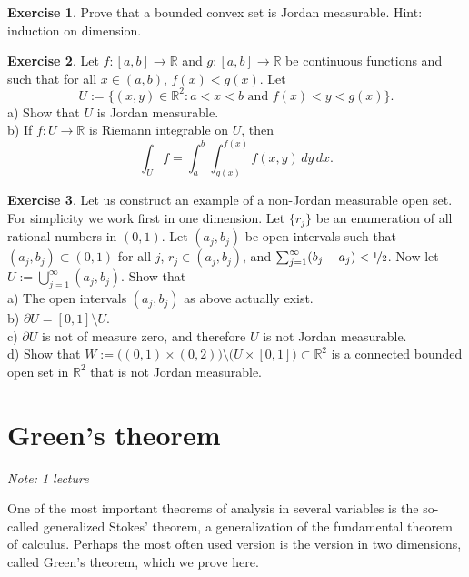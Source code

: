 \documentclass[12pt]{book}
\newcommand{\R}{{\mathbb{R}}}
\newcommand{\sectionnotes}[1]{\noindent \emph{Note: #1} \medskip \par}
\newcommand{\sectionnewpage}{\clearpage}
\theoremstyle{plain}
\theoremstyle{remark}
\theoremstyle{definition}
\theoremstyle{exercise}
\newtheorem{exercise}{Exercise}[section]
\theoremstyle{example}
\begin{document}
\begin{exercise}
Prove that a bounded convex set is Jordan measurable.  Hint: induction on
dimension.
\end{exercise}

\begin{exercise} \label{exercise:intovertypeIset}
Let $f \colon [a,b] \to \R$ and
$g \colon [a,b] \to \R$ be continuous functions and such that
for all $x \in (a,b)$, $f(x) < g(x)$.  Let
\begin{equation*}
U := \{ (x,y) \in \R^2 : a < x < b \text{ and } f(x) < y < g(x) \} .
\end{equation*}
a) Show that $U$ is Jordan measurable.\\
b) If $f \colon U \to \R$ is Riemann integrable on $U$, then
\begin{equation*}
\int_U f =
\int_a^b \int_{g(x)}^{f(x)} f(x,y) \, dy \, dx .
\end{equation*}
\end{exercise}

\begin{exercise}
Let us construct an example of a non-Jordan measurable open set.  For
simplicity we work first in one dimension.  Let $\{ r_j \}$ be an enumeration
of all rational numbers in $(0,1)$.  Let $(a_j,b_j)$ be open intervals
such that $(a_j,b_j) \subset (0,1)$ for all $j$, $r_j \in (a_j,b_j)$,
and $\sum_{j=1}^\infty (b_j-a_j) < \nicefrac{1}{2}$.  Now let $U :=
\bigcup_{j=1}^\infty (a_j,b_j)$.  Show that\\
a) The open intervals $(a_j,b_j)$ as above actually exist.\\
b)
$\partial U = [0,1] \setminus U$.\\
c)
$\partial U$ is not of measure zero, and therefore $U$ is not Jordan measurable.\\
d) Show that $W := \bigl( (0,1) \times (0,2) \bigr) \setminus \bigl( U
\times [0,1] \bigr) \subset \R^2$ is a connected bounded open set in $\R^2$
that is not Jordan measurable.
\end{exercise}


\sectionnewpage
\section{Green's theorem}
\label{sec:mvgreenstheorem}

\sectionnotes{1 lecture}

One of the most important theorems of analysis in several variables is the
so-called generalized Stokes' theorem, a generalization of the
fundamental theorem of calculus.  Perhaps the most often used version is the
version in two dimensions, called Green's theorem, which we 
prove here.
\end{document}
